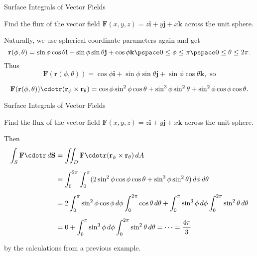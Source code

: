 \documentclass[11pt,english,
handout
]{beamer}
\begin{document}
\begin{frame}[t]{Surface Integrals of Vector Fields}
\small
\begin{example}
Find the flux of the vector field $\mathbf{F}(x,y,z)=z\mathbf{i}+y\mathbf{j}+x\mathbf{k}$ across the unit sphere.

\lspace
Naturally, we use spherical coordinate parameters again and get
\[
\mathbf{r}(\phi,\theta)=\sin\phi\cos\theta\mathbf{i}+\sin\phi\sin\theta\mathbf{j}+\cos\phi\mathbf{k} \pspace 0\leq\phi\leq\pi \pspace 0\leq\theta\leq2\pi.
\]\pause
Thus
\[
\mathbf{F}(\mathbf{r}(\phi,\theta))=\cos\phi\mathbf{i}+\sin\phi\sin\theta\mathbf{j}+\sin\phi\cos\theta\mathbf{k},\text{ so}
\]

\[
\mathbf{F}(\mathbf{r}(\phi,\theta))\cdotr(\mathbf{r}_\phi\times\mathbf{r}_\theta)=\cos\phi\sin^2\phi\cos\theta+\sin^3\phi\sin^2\theta+\sin^2\phi\cos\phi\cos\theta.
\]
\end{example}
\end{frame}














\begin{frame}[t]{Surface Integrals of Vector Fields}
\small
\begin{example}
Find the flux of the vector field $\mathbf{F}(x,y,z)=z\mathbf{i}+y\mathbf{j}+x\mathbf{k}$ across the unit sphere.

\lspace
Then
\begin{align*}
\int_S\mathbf{F}\cdotr\,d\mathbf{S}&=\iint_D\mathbf{F}\cdotr(\mathbf{r}_\phi\times\mathbf{r}_\theta)\,dA\\[2mm]
&=\int_0^{2\pi}\int_0^\pi(2\sin^2\phi\cos\phi\cos\theta+\sin^3\phi\sin^2\theta)\,d\phi\,d\theta\\[2mm]
&=2\int_0^\pi\sin^2\phi\cos\phi\,d\phi\int_0^{2\pi}\cos\theta\,d\theta+\int_0^\pi\sin^3\phi\,d\phi\int_0^{2\pi}\sin^2\theta\,d\theta\\[2mm]
&=0+\int_0^\pi\sin^3\phi\,d\phi\int_0^{2\pi}\sin^2\theta\,d\theta=\cdots=\frac{4\pi}{3}
\end{align*}

by the calculations from a previous example.
\end{example}
\end{frame}
\end{document}
